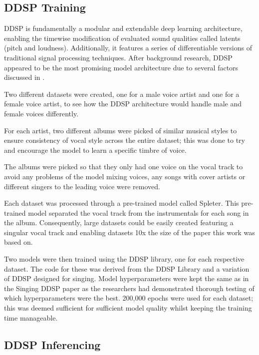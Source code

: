 \subsection{DDSP Training}

DDSP is fundamentally a modular and extendable deep learning architecture, enabling the timewise modification of evaluated sound qualities called latents (pitch and loudness). Additionally, it features a series of differentiable versions of traditional signal processing techniques. After background research, DDSP appeared to be the most promising model architecture due to several factors discussed in .

Two different datasets were created, one for a male voice artist and one for a female voice artist, to see how the DDSP architecture would handle male and female voices differently.

For each artist, two different albums were picked of similar musical styles to ensure consistency of vocal style across the entire dataset; this was done to try and encourage the model to learn a specific timbre of voice.

The albums were picked so that they only had one voice on the vocal track to avoid any problems of the model mixing voices, any songs with cover artists or different singers to the leading voice were removed.

Each dataset was processed through a pre-trained model called Spleter\cite{Spleeter}. This pre-trained model separated the vocal track from the instrumentals for each song in the album. Consequently, large datasets could be easily created featuring a singular vocal track and enabling datasets 10x the size of the paper this work was based on\cite{SingingDDSP}.

Two models were then trained using the DDSP library\cite{DDSPPip}, one for each respective dataset. The code for these was derived from the DDSP Library and a variation of DDSP designed for singing\cite{SingingDDSP}. Model hyperparameters were kept the same as in the Singing DDSP paper\cite{SingingDDSP} as the researchers had demonstrated thorough testing of which hyperparameters were the best. 200,000 epochs were used for each dataset; this was deemed sufficient for sufficient model quality whilst keeping the training time manageable.

\subsection{DDSP Inferencing}

